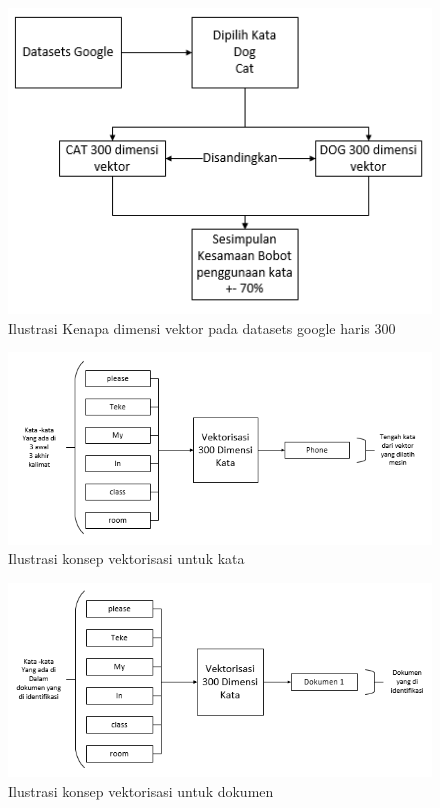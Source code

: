 \begin{figure}
      \centerline{\includegraphics[width=1\textwidth]
      {figures/cokro/c72}}
      \caption{Ilustrasi Kenapa dimensi vektor pada datasets google haris 300}
      \label{c72}
      \end{figure}

\begin{figure}
      \centerline{\includegraphics[width=1\textwidth]
      {figures/cokro/c73}}
      \caption{Ilustrasi konsep vektorisasi untuk kata}
      \label{c73}
      \end{figure}

\begin{figure}
      \centerline{\includegraphics[width=1\textwidth]
      {figures/cokro/c74}}
      \caption{Ilustrasi konsep vektorisasi untuk dokumen}
      \label{c74}
      \end{figure}

